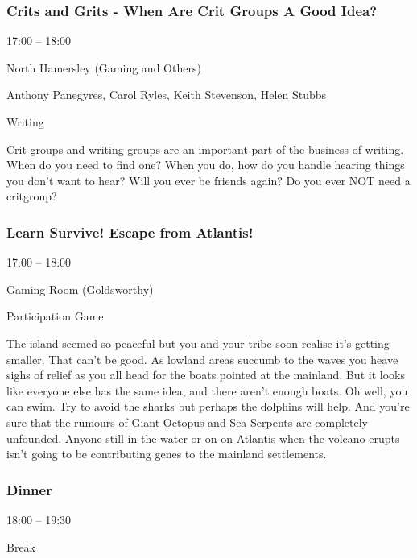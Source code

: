 \documentclass{scrreprt}
\begin{document}
\begin{multicols}{2}
\subsubsection*{Crits and Grits - When Are Crit Groups A Good Idea?}\begin{description}
\setlength{\itemsep}{0pt}
\setlength{\parsep}{0pt}
\setlength{\parskip}{0pt}
\item[Time:]{17:00 -- 18:00}
\item[Venue:]{North Hamersley (Gaming and Others)}
\item[People:]{Anthony Panegyres, Carol Ryles, Keith Stevenson, Helen Stubbs}
\item[Tags:]{Writing}\end{description}
Crit groups and writing groups are an important part of the business of writing. When do you need to find one? When you do, how do you handle hearing things you don't want to hear? Will you ever be friends again? Do you ever NOT need a critgroup?
\subsubsection*{Learn Survive! Escape from Atlantis!}\begin{description}
\setlength{\itemsep}{0pt}
\setlength{\parsep}{0pt}
\setlength{\parskip}{0pt}
\item[Time:]{17:00 -- 18:00}
\item[Venue:]{Gaming Room (Goldsworthy)}
\item[Tags:]{Participation Game}\end{description}
The island seemed so peaceful but you and your tribe soon realise it's getting smaller. That can't be good. As lowland areas succumb to the waves you heave sighs of relief as you all head for the boats pointed at the mainland. But it looks like everyone else has the same idea, and there aren't enough boats. Oh well, you can swim. Try to avoid the sharks but perhaps the dolphins will help. And you're sure that the rumours of Giant Octopus and Sea Serpents are completely unfounded. Anyone still in the water or on on Atlantis when the volcano erupts isn't going to be contributing genes to the mainland settlements.
\subsubsection*{Dinner}\begin{description}
\setlength{\itemsep}{0pt}
\setlength{\parsep}{0pt}
\setlength{\parskip}{0pt}
\item[Time:]{18:00 -- 19:30}
\item[Tags:]{Break}\end{description}


\end{multicols}
\end{document}
